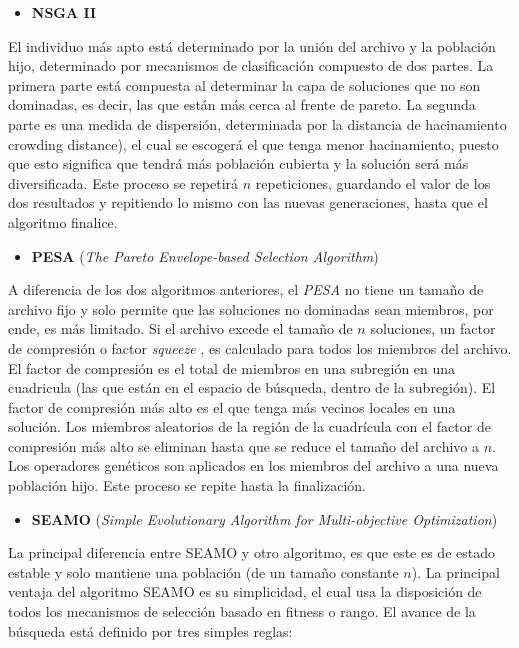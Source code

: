 \documentclass[]{article}
\providecommand{\tightlist}{%
  \setlength{\itemsep}{0pt}\setlength{\parskip}{0pt}}
\begin{document}
\begin{itemize}
\tightlist
\item
  \textbf{NSGA II}
\end{itemize}

El individuo más apto está determinado por la unión del archivo y la
población hijo, determinado por mecanismos de clasificación compuesto de
dos partes. La primera parte está compuesta al determinar la capa de
soluciones que no son dominadas, es decir, las que están más cerca al
frente de pareto. La segunda parte es una medida de dispersión,
determinada por la distancia de hacinamiento crowding distance), el cual
se escogerá el que tenga menor hacinamiento, puesto que esto significa
que tendrá más población cubierta y la solución será más diversificada.
Este proceso se repetirá \(n\) repeticiones, guardando el valor de los
dos resultados y repitiendo lo mismo con las nuevas generaciones, hasta
que el algoritmo finalice.

\begin{itemize}
\tightlist
\item
  \textbf{PESA} (\emph{The Pareto Envelope-based Selection Algorithm})
\end{itemize}

A diferencia de los dos algoritmos anteriores, el \emph{PESA} no tiene
un tamaño de archivo fijo y solo permite que las soluciones no dominadas
sean miembros, por ende, es más limitado. Si el archivo excede el tamaño
de \(n\) soluciones, un factor de compresión o factor \emph{squeeze} ,
es calculado para todos los miembros del archivo. El factor de
compresión es el total de miembros en una subregión en una cuadricula
(las que están en el espacio de búsqueda, dentro de la subregión). El
factor de compresión más alto es el que tenga más vecinos locales en una
solución. Los miembros aleatorios de la región de la cuadrícula con el
factor de compresión más alto se eliminan hasta que se reduce el tamaño
del archivo a \(n\). Los operadores genéticos son aplicados en los
miembros del archivo a una nueva población hijo. Este proceso se repite
hasta la finalización.

\begin{itemize}
\tightlist
\item
  \textbf{SEAMO} (\emph{Simple Evolutionary Algorithm for
  Multi-objective Optimization})
\end{itemize}

La principal diferencia entre SEAMO y otro algoritmo, es que este es de
estado estable y solo mantiene una población (de un tamaño constante
\(n\)). La principal ventaja del algoritmo SEAMO es su simplicidad, el
cual usa la disposición de todos los mecanismos de selección basado en
fitness o rango. El avance de la búsqueda está definido por tres simples
reglas:
\end{document}
